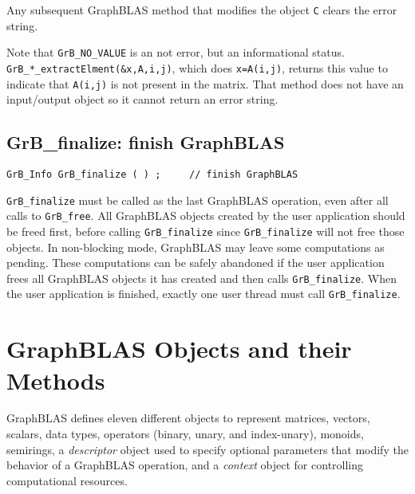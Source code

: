 \documentclass[12pt]{article}
\begin{document}
Any subsequent GraphBLAS method that modifies the object \verb'C' clears the
error string.

Note that \verb'GrB_NO_VALUE' is an not error, but an informational status.
\verb'GrB_*_extractElment(&x,A,i,j)', which does \verb'x=A(i,j)', returns this
value to indicate that \verb'A(i,j)' is not present in the matrix.  That
method does not have an input/output object so it cannot return an error
string.

\subsection{{\sf GrB\_finalize:} finish GraphBLAS} %
\label{finalize}

\begin{mdframed}[userdefinedwidth=6in]
{\footnotesize
\begin{verbatim}
GrB_Info GrB_finalize ( ) ;     // finish GraphBLAS
\end{verbatim}
}\end{mdframed}

\verb'GrB_finalize' must be called as the last GraphBLAS operation, even after
all calls to \verb'GrB_free'.  All GraphBLAS objects created by the user
application should be freed first, before calling \verb'GrB_finalize' since
\verb'GrB_finalize' will not free those objects.  In non-blocking mode,
GraphBLAS may leave some computations as pending.  These computations can be
safely abandoned if the user application frees all GraphBLAS objects it has
created and then calls \verb'GrB_finalize'.  When the user application is
finished, exactly one user thread must call \verb'GrB_finalize'.

\newpage
\section{GraphBLAS Objects and their Methods} %
\label{objects}

GraphBLAS defines eleven different objects to represent matrices, vectors,
scalars, data types, operators (binary, unary, and index-unary), monoids,
semirings, a {\em descriptor} object used to specify optional parameters
that modify the behavior of a GraphBLAS operation, and a {\em context}
object for controlling computational resources.
\end{document}
